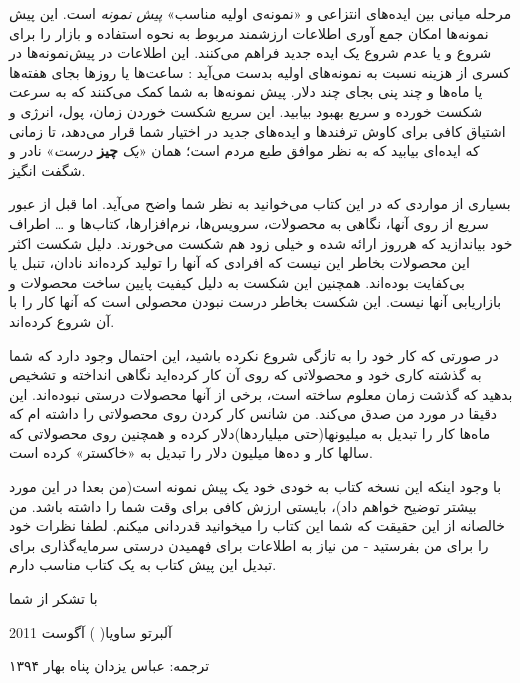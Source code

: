 مرحله میانی بین ایده‌های انتزاعی و «نمونه‌‌ی اولیه مناسب» \emph{پیش
نمونه} است. این پیش نمونه‌ها امکان جمع آوری اطلاعات ارزشمند مربوط به
نحوه استفاده و بازار را برای شروع و یا عدم شروع یک ایده جدید فراهم
می‌کنند. این اطلاعات در پیش‌نمونه‌ها در کسری از هزینه نسبت به نمونه‌های
اولیه بدست می‌آید : ساعت‌ها یا روزها بجای هفته‌ها یا ماه‌ها و چند پنی
بجای چند دلار. پیش نمونه‌ها به شما کمک می‌کنند که به سرعت شکست خورده و
سریع بهبود بیابید. این سریع شکست خوردن زمان، پول، انرژی و اشتیاق کافی
برای کاوش ترفند‌ها و ایده‌های جدید در اختیار شما قرار می‌دهد، تا زمانی
که ایده‌ای بیابید که به نظر موافق طبع مردم است؛ همان «\emph{یک}
\textbf{چیز} \emph{درست}» نادر و شگفت انگیز.

بسیاری از مواردی که در این کتاب می‌خوانید به نظر شما واضح می‌آید. اما
قبل از عبور سریع از روی آنها، نگاهی به محصولات، سرویس‌ها، نرم‌افزارها،
کتاب‌ها و \ldots{} اطراف خود بیاندازید که هرروز ارائه شده و خیلی زود هم
شکست می‌خورند. دلیل شکست اکثر این محصولات بخاطر این نیست که افرادی که
آنها را تولید کرده‌اند نادان، تنبل یا بی‌کفایت بوده‌اند. همچنین این شکست
به دلیل کیفیت پایین ساخت محصولات و بازاریابی آنها نیست. این شکست بخاطر
درست نبودن محصولی است که آنها کار را با آن شروع کرده‌اند.

در صورتی که کار خود را به تازگی شروع نکرده باشید، این احتمال وجود دارد
که شما به گذشته کاری خود و محصولاتی که روی آن کار کرده‌اید نگاهی انداخته
و تشخیص بدهید که گذشت زمان معلوم ساخته است، برخی از آنها محصولات درستی
نبوده‌اند. این دقیقا در مورد من صدق می‌کند. من شانس کار کردن روی
محصولاتی را داشته ام که ماه‌ها کار را تبدیل به میلیونها(حتی
میلیاردها)دلار کرده و همچنین روی محصولاتی که سالها کار و ده‌ها میلیون
دلار را تبدیل به «خاکستر» کرده است.

با وجود اینکه این نسخه کتاب به خودی خود یک پیش نمونه است(من بعدا در این
مورد بیشتر توضیح خواهم داد)، بایستی ارزش کافی برای وقت شما را داشته
باشد. من خالصانه از این حقیقت که شما این کتاب را میخوانید قدردانی میکنم.
لطفا نظرات خود را برای من بفرستید - من نیاز به اطلاعات برای فهمیدن درستی
سرمایه‌گذاری برای تبدیل این پیش کتاب به یک کتاب مناسب دارم.

با تشکر از شما

آلبرتو ساویا(  ) آگوست 2011

ترجمه: عباس یزدان پناه بهار ۱۳۹۴
